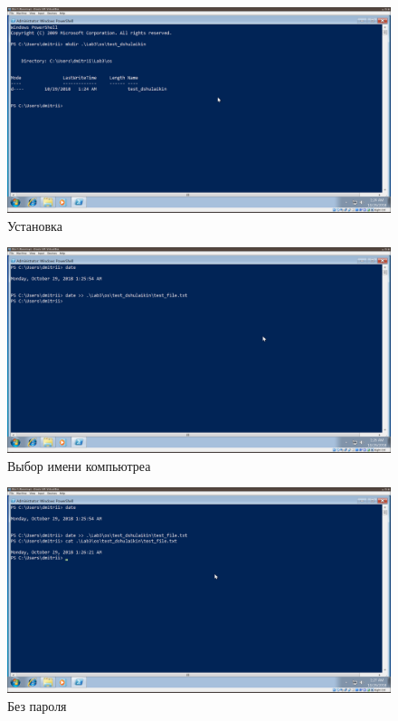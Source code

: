 \documentclass[a4paper]{article}
\begin{document}
\begin{figure}[H]
    \centering
    \includegraphics[width=\linewidth]{21.png}
    \caption{Установка}
\end{figure}

\begin{figure}[H]
    \centering
    \includegraphics[width=\linewidth]{22.png}
    \caption{Выбор имени компьютреа}
\end{figure}

\begin{figure}[H]
    \centering
    \includegraphics[width=\linewidth]{23.png}
    \caption{Без пароля}
\end{figure}
\end{document}
